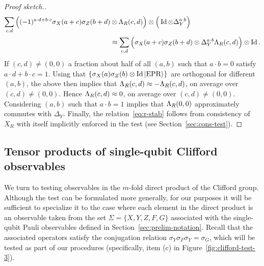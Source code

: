 \begin{proof}[Proof sketch.]
\begin{align*}
\sum_{c,d} \Big((-1)^{a\cdot d  +b\cdot c}\sigma_X(a+c)\sigma_Z(b+d) &\otimes \Lambda_R(c,d)\Big) \otimes \Big(\mathop{\rm Id}\nolimits \otimes \Delta_Y^{a\cdot b}\Big)\\
& \approx \sum_{c,d} \Big( \sigma_X(a+c)\sigma_Z(b+d) \otimes \Delta_Y^{a\cdot b } \Lambda_R(c,d)\Big) \otimes \mathop{\rm Id}\nolimits .
\end{align*}
If $(c,d)\neq (0,0)$ a fraction about half of all $(a,b)$ such that $a\cdot b = 0$ satisfy $a\cdot d + b\cdot c = 1$. Using that $\{\sigma_X(a)\sigma_Z(b) \otimes \mathop{\rm Id}\nolimits |{\rm EPR}\rangle\}$ are orthogonal for different $(a,b)$, the above then implies that $\Lambda_R(c,d)\approx -\Lambda_R(c,d)$, on average over $(c,d)\neq (0,0)$. Hence $\Lambda_R(c,d)\approx 0$, on average over $(c,d)\neq (0,0)$. 
Considering $(a,b)$ such that $a\cdot b=1$ implies that $\Lambda_R(0,0)$ approximately commutes with $\Delta_Y$. Finally, the relation~\eqref{eq:r-stab} follows from consistency of $X_R$ with itself implicitly enforced in the test (see Section~\ref{sec:cons-test}).
\end{proof}

\subsection{Tensor products of single-qubit Clifford observables}
\label{sec:n-2-clifford}

We turn to testing observables in the $m$-fold direct product of the Clifford group. Although the test can be formulated more generally, for our purposes it will be sufficient to specialize it to the case where each element in the direct product is an observable taken from the set  $\Sigma = \{X,Y,Z,F,G\}$ associated with the single-qubit Pauli observables defined in Section~\ref{sec:prelim-notation}. Recall that the associated operators satisfy the conjugation relation $\sigma_Y \sigma_F \sigma_Y = \sigma_G$, which will be tested as part of our procedures (specifically, item (c) in Figure~\ref{fig:clifford-test-3}).

